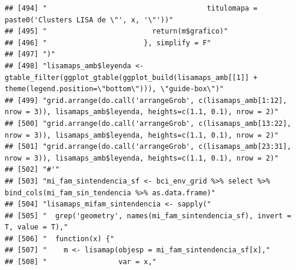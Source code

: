 \documentclass[11pt,]{article}
\begin{document}
\begin{verbatim}
## [494] "                                      titulomapa = paste0('Clusters LISA de \"', x, '\"'))"                                                                            
## [495] "                         return(m$grafico)"                                                                                                                            
## [496] "                       }, simplify = F"                                                                                                                                
## [497] ")"                                                                                                                                                                     
## [498] "lisamaps_amb$leyenda <- gtable_filter(ggplot_gtable(ggplot_build(lisamaps_amb[[1]] + theme(legend.position=\"bottom\"))), \"guide-box\")"                              
## [499] "grid.arrange(do.call('arrangeGrob', c(lisamaps_amb[1:12], nrow = 3)), lisamaps_amb$leyenda, heights=c(1.1, 0.1), nrow = 2)"                                            
## [500] "grid.arrange(do.call('arrangeGrob', c(lisamaps_amb[13:22], nrow = 3)), lisamaps_amb$leyenda, heights=c(1.1, 0.1), nrow = 2)"                                           
## [501] "grid.arrange(do.call('arrangeGrob', c(lisamaps_amb[23:31], nrow = 3)), lisamaps_amb$leyenda, heights=c(1.1, 0.1), nrow = 2)"                                           
## [502] "#'"                                                                                                                                                                    
## [503] "mi_fam_sintendencia_sf <- bci_env_grid %>% select %>% bind_cols(mi_fam_sin_tendencia %>% as.data.frame)"                                                               
## [504] "lisamaps_mifam_sintendencia <- sapply("                                                                                                                                
## [505] "  grep('geometry', names(mi_fam_sintendencia_sf), invert = T, value = T),"                                                                                             
## [506] "  function(x) {"                                                                                                                                                       
## [507] "    m <- lisamap(objesp = mi_fam_sintendencia_sf[x],"                                                                                                                  
## [508] "                 var = x,"                                                                                                                                             

\end{verbatim}
\end{document}
